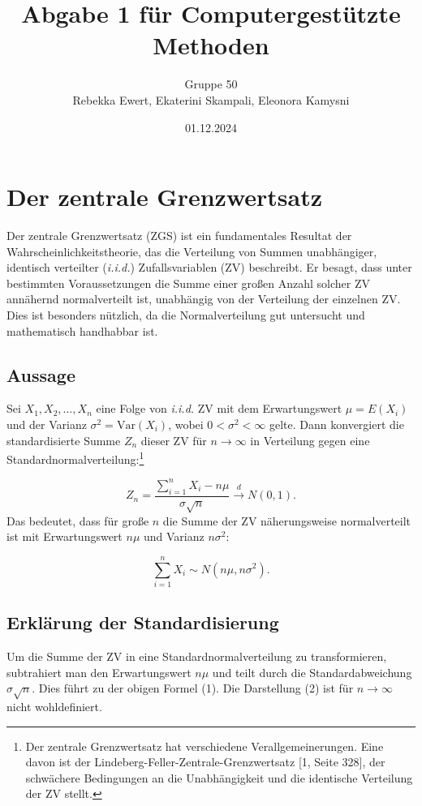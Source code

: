 \documentclass[a4paper,12pt]{article}
\title{Abgabe 1 für Computergestützte Methoden}
\author{Gruppe 50 \\ Rebekka Ewert, Ekaterini Skampali, Eleonora Kamysni}
\date{01.12.2024}
\begin{document}
\maketitle

\tableofcontents

\newpage

\section{Der zentrale Grenzwertsatz}
Der zentrale Grenzwertsatz (ZGS) ist ein fundamentales Resultat der Wahrscheinlichkeitstheorie, das die Verteilung von Summen unabhängiger, identisch verteilter (\textit{i.i.d.}) Zufallsvariablen (ZV) beschreibt. Er besagt, dass unter bestimmten Voraussetzungen die Summe einer großen Anzahl solcher ZV annähernd normalverteilt ist, unabhängig von der Verteilung der einzelnen ZV. Dies ist besonders nützlich, da die Normalverteilung gut untersucht und mathematisch handhabbar ist.

\subsection{Aussage}
Sei \(X_1, X_2, \dots, X_n\) eine Folge von \textit{i.i.d.} ZV mit dem Erwartungswert \(\mu = E(X_i)\) und der Varianz \(\sigma^2 = \text{Var}(X_i)\), wobei \(0 < \sigma^2 < \infty\) gelte. Dann konvergiert die standardisierte Summe \(Z_n\) dieser ZV für \(n \to \infty\) in Verteilung gegen eine Standardnormalverteilung:\footnote{Der zentrale Grenzwertsatz hat verschiedene Verallgemeinerungen. Eine davon ist der Lindeberg-Feller-Zentrale-Grenzwertsatz [1, Seite 328], der schwächere Bedingungen an die Unabhängigkeit und die identische Verteilung der ZV stellt.}

\begin{equation}
Z_n = \frac{\sum_{i=1}^n X_i - n\mu}{\sigma \sqrt{n}} \overset{d}{\to} N(0, 1).
\end{equation}
Das bedeutet, dass für große \(n\) die Summe der ZV näherungsweise normalverteilt ist mit Erwartungswert \(n\mu\) und Varianz \(n\sigma^2\):

\begin{equation}
\sum_{i=1}^n X_i \sim N(n\mu, n\sigma^2).
\end{equation}

\subsection{Erklärung der Standardisierung}
Um die Summe der ZV in eine Standardnormalverteilung zu transformieren, subtrahiert man den Erwartungswert \(n\mu\) und teilt durch die Standardabweichung \(\sigma \sqrt{n}\). Dies führt zu der obigen Formel (1). Die Darstellung (2) ist für \(n \to \infty\) nicht wohldefiniert.
\end{document}
